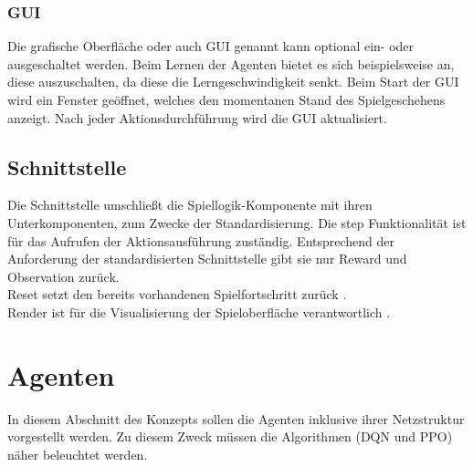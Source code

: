 \subsubsection{GUI} \label{susubsec:Konzept_GUI}
Die grafische Oberfläche oder auch GUI genannt kann optional ein- oder ausgeschaltet werden. Beim Lernen der Agenten bietet es sich beispielsweise an, diese auszuschalten, da diese die Lerngeschwindigkeit senkt. Beim Start der GUI wird ein Fenster geöffnet, welches den momentanen Stand des Spielgeschehens anzeigt. Nach jeder Aktionsdurchführung wird die GUI aktualisiert.

\subsection{Schnittstelle} \label{subsec:Konzept_Schnittstelle}
Die Schnittstelle umschließt die Spiellogik-Komponente mit ihren Unterkomponenten, zum Zwecke der Standardisierung.
Die step Funktionalität ist für das Aufrufen der Aktionsausführung zuständig. Entsprechend der Anforderung der standardisierten Schnittstelle  gibt sie nur Reward und Observation zurück.\\
Reset setzt den bereits vorhandenen Spielfortschritt zurück .\\
Render ist für die Visualisierung der Spieloberfläche verantwortlich .

\section{Agenten} \label{sec:Konzept_Agenten}
In diesem Abschnitt des Konzepts sollen die Agenten inklusive ihrer Netzstruktur vorgestellt werden. Zu diesem Zweck müssen die Algorithmen (DQN und PPO) näher beleuchtet werden.

